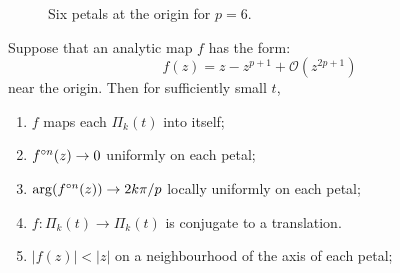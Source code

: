 \begin{figure}[ht]
	\centering
	\caption{Six petals at the origin for $p=6$.}
	\label{petals}
\end{figure}

\begin{theorem}
Suppose that an analytic map \( f \) has the form:\[
	f(z)=z-z^{p+1}+\mathcal{O}(z^{2p+1})
\] near the origin. Then for sufficiently small \( t \),
\begin{enumerate}
	\item \( f \) maps each \( \Pi_k(t) \) into itself;
	\item \( \fof[n](z)\to 0 \) uniformly on each petal;
	\item \( \arg(\fof[n](z))\to 2k\pi /p \) locally uniformly on each petal;
	\item \( f:\Pi_k(t)\to \Pi_k(t) \) is conjugate to a translation.
	\item \( |f(z)|<|z| \) on a neighbourhood of the axis of each petal;
\end{enumerate}
\end{theorem}


